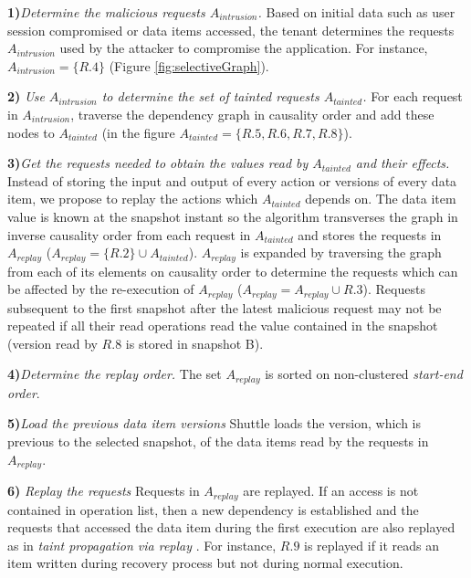 \textbf{1)}\textit{Determine the malicious requests $A_{intrusion}$.}
  Based on initial data such as user session compromised or data items accessed, the tenant determines the requests $A_{intrusion}$ used by the attacker to compromise the application. For instance, $A_{intrusion} = \{R.4\} $ (Figure \ref{fig:selectiveGraph}).
  
\textbf{2)} \textit{Use $A_{intrusion}$ to determine the set of tainted requests $A_{tainted}$.}
  For each request in $A_{intrusion}$, traverse the dependency graph in causality order and add these nodes to $A_{tainted}$ (in the figure $A_{tainted} = \{R.5,R.6,R.7,R.8\}$).

\textbf{3)}\textit{Get the requests needed to obtain the values read by $A_{tainted}$ and their effects.} 
  Instead of storing the input and output of every action or versions of every data item, we propose to replay the actions which $A_{tainted}$ depends on. The data item value is known at the snapshot instant so the algorithm transverses the graph in inverse causality order from each request in $A_{tainted}$ and stores the requests in $A_{replay}$ ($A_{replay} = \{R.2\} \cup A_{tainted}$). $A_{replay}$ is expanded by traversing the graph from each of its elements on causality order to determine the requests which can be affected by the re-execution of $A_{replay}$ ($A_{replay} = A_{replay} \cup R.3$). Requests subsequent to the first snapshot after the latest malicious request may not be repeated if all their read operations read the value contained in the snapshot (version read by $R.8$ is stored in snapshot B).

\textbf{4)}\textit{Determine the replay order.} 
  The set $A_{replay}$ is sorted on non-clustered \emph{start-end order}.

\textbf{5)}\textit{Load the previous data item versions}
  Shuttle loads the version, which is previous to the selected snapshot, of the data items read by the requests in $A_{replay}$.

\textbf{6)} \textit{Replay the requests}
  Requests in $A_{replay}$ are replayed. If an access is not contained in operation list, then a new dependency is established and the requests that accessed the data item during the first execution are also replayed as in \emph{taint propagation via replay} \cite{retro}. For instance, $R.9$ is replayed if it reads an item written during recovery process but not during normal execution. 

